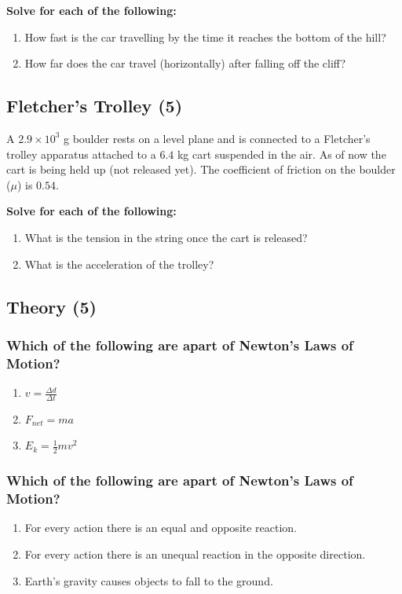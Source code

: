 \documentclass{article}
\begin{document}
\vspace{10pt}

\noindent\textbf{Solve for each of the following:}
\begin{enumerate}[label=\alph*)]
    \item How fast is the car travelling by the time it reaches the bottom of the hill?
    \item How far does the car travel (horizontally) after falling off the cliff?
\end{enumerate}\leavevmode

\subsection{Fletcher's Trolley (5)}
A $2.9 \times 10^3$ g boulder rests on a level plane and is connected to a Fletcher's trolley apparatus
attached to a $6.4$ kg cart suspended in the air. As of now the cart is being held up (not released yet).
The coefficient of friction on the boulder ($\mu$) is $0.54$.

\vspace{10pt}

\noindent\textbf{Solve for each of the following:}
\begin{enumerate}[label=\alph*)]
    \item What is the tension in the string once the cart is released?
    \item What is the acceleration of the trolley?
\end{enumerate}\leavevmode

\subsection{Theory (5)}
\subsubsection{Which of the following are apart of Newton's Laws of Motion?}
\begin{enumerate}[label=\alph*)]
    \item $v = \frac{\Delta d}{\Delta t}$
    \item $F_{net} = ma$
    \item $E_{k} = \frac{1}{2}mv^2$
\end{enumerate}\leavevmode
\subsubsection{Which of the following are apart of Newton's Laws of Motion?}
\begin{enumerate}[label=\alph*)]
    \item For every action there is an equal and opposite reaction.
    \item For every action there is an unequal reaction in the opposite direction.
    \item Earth's gravity causes objects to fall to the ground.
\end{enumerate}
\end{document}
